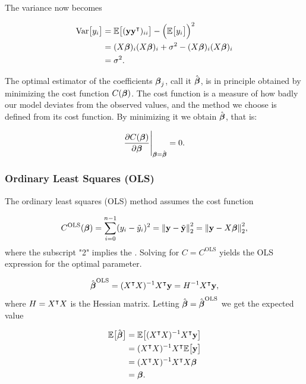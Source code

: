 The variance now becomes

\begin{align*}
    \text{Var}\big[y_i\big] &= \mathbb{E}\big[(\mathbf{y}\mathbf{y}^\intercal)_{ii}\big] -\Big(\mathbb{E}\big[y_i\big]\Big)^2\\
    &= (X\boldsymbol{\beta})_{i} (X\boldsymbol{\beta})_{i} + \sigma^2 - (X\boldsymbol{\beta})_{i} (X\boldsymbol{\beta})_{i}\\
    &= \sigma^2.
\end{align*}


The optimal estimator of the coefficients $\boldsymbol{\beta}_j$, call it $\hat{\boldsymbol{\beta}}$, is in principle obtained by minimizing the cost function $C(\boldsymbol{\beta})$. The cost function is a measure of how badly our model deviates from the observed values, and the method we choose is defined from its cost function. By minimizing it we obtain $\hat{\boldsymbol{\beta}}$, that is:

\begin{align}
    \pdv{C(\boldsymbol{\beta})}{\boldsymbol{\beta}}\Bigg|_{\boldsymbol{\beta}=\hat{\boldsymbol{\beta}}} = 0.
    \label{eq:general_LS}
\end{align}



\subsubsection{Ordinary Least Squares (OLS)}\label{sec:OLS}

The ordinary least squares (OLS) method assumes the cost function

\begin{align*}
    C^\text{OLS}(\boldsymbol{\beta}) = \sum_{i=0}^{n-1}(y_i - \tilde{y}_i)^2 =  \norm{\mathbf{y}-\tilde{\mathbf{y}}}_2^{2} = \norm{\mathbf{y}-X\boldsymbol{\beta}}_2^{2},
\end{align*}
where the subscript "2" implies the \footnotemark. Solving  for $C=C^\text{OLS}$ yields the OLS expression for the optimal parameter.

\begin{align}\label{eq:optimal_beta_ols}
    \hat{\boldsymbol{\beta}}^\text{OLS} = (X^\intercal X)^{-1} X^\intercal \mathbf{y} = H^{-1} X^\intercal \mathbf{y},
\end{align}
where $H = X^\intercal X$ is the Hessian matrix.
Letting $\hat{\boldsymbol{\beta}} = \hat{\boldsymbol{\beta}}^\text{OLS}$ we get the expected value 

\begin{align*}
    \mathbb{E}\big[\hat{\boldsymbol{\beta}}\big] &= \mathbb{E}\big[(X^\intercal X)^{-1} X^\intercal \mathbf{y}\big] \\
    &= (X^\intercal X)^{-1} X^\intercal \mathbb{E}\big[\mathbf{y}\big] \\
    &= (X^\intercal X)^{-1} X^\intercal X \boldsymbol{\beta} \\
    &= \boldsymbol{\beta}.
\end{align*}

